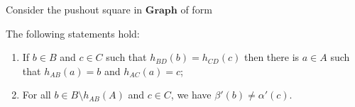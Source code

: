 \begin{lemma}
    \label{lem:b_c_same_img_exist_a}
    Consider the pushout square in $\mathbf{Graph}$ of form
    \begin{center}{\normalfont
    }\end{center} 
    The following statements hold:
    \begin{enumerate}
        \item  If $ b\in B $ and $ c \mathop{\in} C $ such that $ h_{BD}(b) \mathop{=} h_{CD}(c) $ then there is $ a \mathop{\in} A $ such that $ h_{AB}(a) \mathop{=} b $ and $ h_{AC}(a)= c $;
        \item  For all \( b \mathop{\in} B \mathop{\setminus} h_{AB}(A) \) and \( c \mathop{\in} C \), we have \( \beta'(b) \mathop{\neq} \alpha'(c) \).
    \end{enumerate}
\end{lemma}

